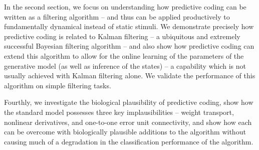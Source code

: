 In the second section, we focus on understanding how predictive coding can be written as a filtering algorithm -- and thus can be applied productively to fundamentally dynamical instead of static stimuli. We demonstrate precisely how predictive coding is related to Kalman filtering -- a ubiquitous and extremely successful Bayesian filtering algorithm \citep{kalman1960contributions,kalman1961new} -- and also show how predictive coding can extend this algorithm to allow for the online learning of the parameters of the generative model (as well as inference of the states) -- a capability which is not usually achieved with Kalman filtering alone. We validate the performance of this algorithm on simple filtering tasks.


Fourthly, we investigate the biological plausibility of predictive coding, show how the standard model possesses three key implausibilities -- weight transport, nonlinear derivatives, and one-to-one error unit connectivity, and show how each can be overcome with biologically plausible additions to the algorithm without causing much of a degradation in the classification performance of the algorithm.


